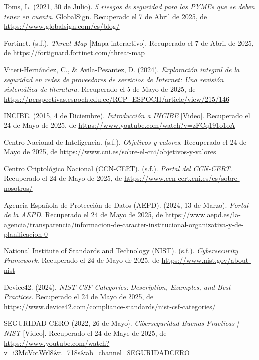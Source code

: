 \documentclass[a4paper, 11pt]{article}
\begin{document}
\begin{thebibliography}{99}
    Toms, L. (2021, 30 de Julio). \textit{5 riesgos de seguridad para las PYMEs que se deben tener en cuenta}. GlobalSign. Recuperado el 7 de Abril de 2025, de \href{https://www.globalsign.com/es/blog/top-5-pequena-empresa-grandes-riesgos-5-riesgos-de-seguridad-para-las-pymes-que-se-deben-tener-en-cuenta}{https://www.globalsign.com/es/blog/} 
        
    Fortinet. (s.f.). \textit{Threat Map} [Mapa interactivo]. Recuperado el 7 de Abril de 2025, de \url{https://fortiguard.fortinet.com/threat-map}

    Viteri-Hernández, C., \& Avila-Pesantez, D. (2024). \textit{Exploración integral de la seguridad en redes de proveedores de servicios de Internet: Una revisión sistemática de literatura}. Recuperado el 5 de Mayo de 2025, de \url{https://perspectivas.espoch.edu.ec/RCP_ESPOCH/article/view/215/146}
        
    INCIBE. (2015, 4 de Diciembre). \textit{Introducción a INCIBE} [Video]. Recuperado el 24 de Mayo de 2025, de \url{https://www.youtube.com/watch?v=zFCq191o1oA}

    Centro Nacional de Inteligencia. (s.f.). \textit{Objetivos y valores}. Recuperado el 24 de Mayo de 2025, de \url{https://www.cni.es/sobre-el-cni/objetivos-y-valores}

    Centro Criptológico Nacional (CCN-CERT). (s.f.). \textit{Portal del CCN-CERT}. Recuperado el 24 de Mayo de 2025, de \url{https://www.ccn-cert.cni.es/es/sobre-nosotros/}

    Agencia Española de Protección de Datos (AEPD). (2024, 13 de Marzo). \textit{Portal de la AEPD}. Recuperado el 24 de Mayo de 2025, de \url{https://www.aepd.es/la-agencia/transparencia/informacion-de-caracter-institucional-organizativa-y-de-planificacion-0}

    National Institute of Standards and Technology (NIST). (s.f.). \textit{Cybersecurity Framework}. Recuperado el 24 de Mayo de 2025, de \url{https://www.nist.gov/about-nist}

    Device42. (2024). \textit{NIST CSF Categories: Description, Examples, and Best Practices}. Recuperado el 24 de Mayo de 2025, de \url{https://www.device42.com/compliance-standards/nist-csf-categories/}

    SEGURIDAD CERO (2022, 26 de Mayo). \textit{Ciberseguridad Buenas Practicas | NIST} [Video]. Recuperado el 24 de Mayo de 2025, de \url{https://www.youtube.com/watch?v=i3McVotWrl8&t=718s&ab_channel=SEGURIDADCERO}


\end{thebibliography}
\end{document}
